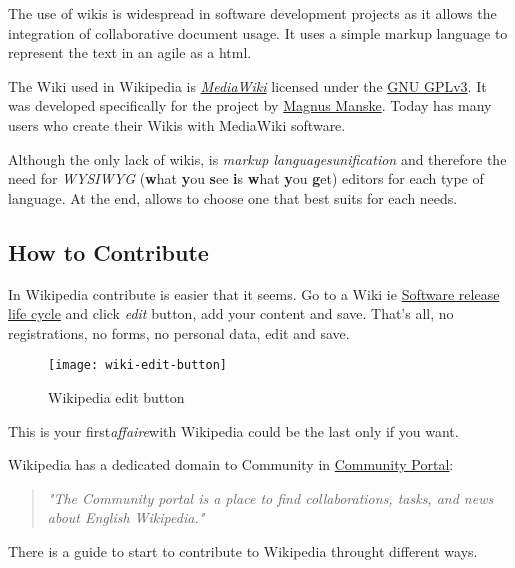\par The use of wikis is widespread in software development projects as it allows the integration of collaborative document usage. It uses a simple markup language to represent the text in an agile as a html.

\par The Wiki used in Wikipedia is \textit{\href{http://www.mediawiki.org/wiki/MediaWiki}{MediaWiki}} licensed under the \href{http://www.gnu.org/licenses/gpl.html}{GNU GPLv3}. It was developed specifically for the project by \href{http://magnusmanske.de/}{Magnus Manske}. Today has many users who create their Wikis with MediaWiki software.

\par Although the only lack of wikis, is \textit{markup languages​​ unification} and therefore the need for \textit{WYSIWYG} (\textbf{w}hat \textbf{y}ou \textbf{s}ee \textbf{i}s \textbf{w}hat \textbf{y}ou \textbf{g}et) editors for each type of language. At the end, allows to choose one that best suits for each needs.

\subsection{How to Contribute}

\par In Wikipedia contribute is easier that it seems. Go to a Wiki ie \href{http://en.wikipedia.org/wiki/Software_release_life_cycle}{Software release life cycle} and click \textit{edit} button, add your content and save. That's all, no registrations, no forms, no personal data, edit and save.

\begin{figure}[H]
    \centering
    \texttt{[image: wiki-edit-button]}
    \caption{Wikipedia edit button}
    \label{wiki-edit}
\end{figure}

\par This is your first\textit{affaire}with Wikipedia could be the last only if you want.

Wikipedia has a dedicated domain to Community in \href{http://en.wikipedia.org/wiki/Wikipedia:Community_portal}{Community Portal}:
\begin{quote}
    \textit{"The Community portal is a place to find collaborations, tasks, and news about English Wikipedia."}
\end{quote}

\par There is a guide to start to contribute to Wikipedia throught different ways.

